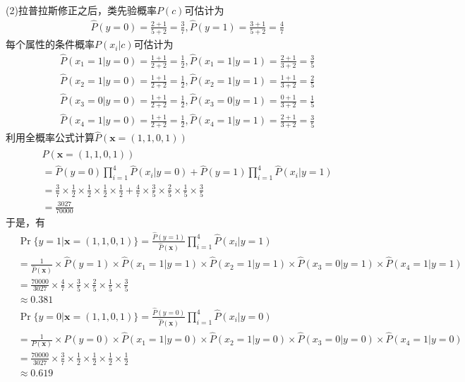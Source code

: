 \documentclass{article}
\begin{document}
	(2)拉普拉斯修正之后，类先验概率$P(c)$可估计为
	\begin{align*}
		& \hat{P}(y=0)=\frac{2+1}{5+2}=\frac{3}{7}, \hat{P}(y=1)=\frac{3+1}{5+2}=\frac{4}{7}
	\end{align*}
	每个属性的条件概率$P(x_i|c)$可估计为
	\begin{align*}
		& \hat{P}(x_1=1|y=0)=\frac{1+1}{2+2}=\frac{1}{2}, \hat{P}(x_1=1|y=1)=\frac{2+1}{3+2}=\frac{3}{5} \\
		& \hat{P}(x_2=1|y=0)=\frac{1+1}{2+2}=\frac{1}{2}, \hat{P}(x_2=1|y=1)=\frac{1+1}{3+2}=\frac{2}{5} \\
		& \hat{P}(x_3=0|y=0)=\frac{1+1}{2+2}=\frac{1}{2}, \hat{P}(x_3=0|y=1)=\frac{0+1}{3+2}=\frac{1}{5} \\
		& \hat{P}(x_4=1|y=0)=\frac{1+1}{2+2}=\frac{1}{2}, \hat{P}(x_4=1|y=1)=\frac{2+1}{3+2}=\frac{3}{5}
	\end{align*}
	利用全概率公式计算$\hat{P}(\mathbf{x}=(1,1,0,1))$
	\begin{align*}
		& \hat{P}(\mathbf{x}=(1,1,0,1)) \\
		& =\hat{P}(y=0)\prod_{i=1}^4\hat{P}(x_i|y=0)+\hat{P}(y=1)\prod_{i=1}^4\hat{P}(x_i|y=1) \\
		& =\frac{3}{7}\times\frac{1}{2}\times\frac{1}{2}\times\frac{1}{2}\times\frac{1}{2}
		+\frac{4}{7}\times\frac{3}{5}\times\frac{2}{5}\times\frac{1}{5}\times\frac{3}{5} \\
		& =\frac{3027}{70000}
	\end{align*}
	于是，有
	\begin{align*}
		& \Pr\{y=1|\mathbf{x}=(1,1,0,1)\}
		  =\frac{\hat{P}(y=1)}{\hat{P}(\mathbf{x})}\prod_{i=1}^4\hat{P}(x_i|y=1) \\
		& =\frac{1}{\hat{P}(\mathbf{x})}\times\hat{P}(y=1)\times 
		  \hat{P}(x_1=1|y=1)\times\hat{P}(x_2=1|y=1)\times\hat{P}(x_3=0|y=1)\times\hat{P}(x_4=1|y=1) \\
		& =\frac{70000}{3027}\times\frac{4}{7}\times
		  \frac{3}{5}\times\frac{2}{5}\times\frac{1}{5}\times\frac{3}{5} \\
		& \approx 0.381 \\
		& \Pr\{y=0|\mathbf{x}=(1,1,0,1)\}
		  =\frac{\hat{P}(y=0)}{\hat{P}(\mathbf{x})}\prod_{i=1}^4\hat{P}(x_i|y=0) \\
		& =\frac{1}{P(\mathbf{x})}\times P(y=0)\times
		  \hat{P}(x_1=1|y=0)\times\hat{P}(x_2=1|y=0)\times\hat{P}(x_3=0|y=0)\times\hat{P}(x_4=1|y=0) \\
		& =\frac{70000}{3027}\times\frac{3}{7}\times
		  \frac{1}{2}\times\frac{1}{2}\times\frac{1}{2}\times\frac{1}{2}\\
		& \approx 0.619
	\end{align*}
\end{document}
